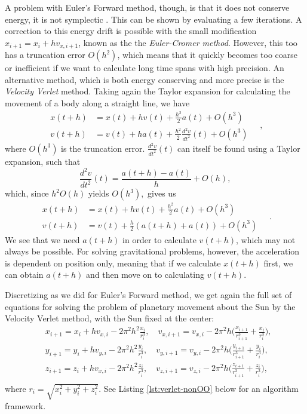 \documentclass[]{article}
\begin{document}
A problem with Euler's Forward method, though, is that it does not conserve energy, it is not symplectic \cite{notes-10-02}. This can be shown by evaluating a few iterations. A correction to this energy drift is possible with the small modification $x_{i+1} = x_i + hv_{x,i+1}$, known as the the \textit{Euler-Cromer method}. However, this too has a truncation error $O(h^2)$, which means that it quickly becomes too coarse or inefficient if we want to calculate long time spans with high precision. An alternative method, which is both energy conserving and more precise is the \textit{Velocity Verlet} method. Taking again the Taylor expansion for calculating the movement of a body along a straight line, we have
\begin{equation}
\begin{aligned}
	x(t+h) &= x(t) + hv(t) + \frac{h^2}{2}a(t) + O(h^3) \\
	v(t+h) &= v(t) + ha(t) + \frac{h^2}{2}\frac{d^2v}{dt^2}(t) + O(h^3)
\end{aligned} \quad ,
\end{equation}
where $O(h^3)$ is the truncation error. $\frac{d^2v}{dt^2}(t)$ can itself be found using a Taylor expansion, such that
\begin{equation}
	\frac{d^2v}{dt^2}(t) = \frac{a(t+h) - a(t)}{h} + O(h),
\end{equation}
which, since $h^2O(h)$ yields $O(h^3)$, gives us 
\begin{equation}
\begin{aligned}
	x(t+h) &= x(t) + hv(t) + \frac{h^2}{2}a(t) + O(h^3) \\
	v(t+h) &= v(t) + \frac{h}{2}(a(t+h) + a(t)) + O(h^3)
\end{aligned} \quad .
\end{equation}
We see that we need $a(t+h)$ in order to calculate $v(t+h)$, which may not always be possible. For solving gravitational problems, however, the acceleration is dependent on position only, meaning that if we calculate $x(t+h)$ first, we can obtain $a(t+h)$ and then move on to calculating $v(t+h)$.

Discretizing as we did for Euler's Forward method, we get again the full set of equations for solving the problem of planetary movement about the Sun by the Velocity Verlet method, with the Sun fixed at the center:
\begin{equation} \label{verlet}
\begin{aligned}
	&x_{i+1} = x_i + hv_{x,i} - 2\pi^2h^2\frac{x_i}{r_i^3} , \quad v_{x,i+1} = v_{x,i} - 2\pi^2h \bigg(\frac{x_{i+1}}{r_{i+1}^3} + \frac{x_i}{r_i^3} \bigg) ,\\
	&y_{i+1} = y_i + hv_{y,i}- 2\pi^2h^2\frac{y_i}{r_i^3} , \quad v_{y,i+1} = v_{y,i} - 2\pi^2h \bigg(\frac{y_{i+1}}{r_{i+1}^3} + \frac{y_i}{r_i^3} \bigg) ,\\
	&z_{i+1} = z_i + hv_{x,i}- 2\pi^2h^2\frac{z_i}{r_i^3} , \quad v_{z,i+1} = v_{z,i} - 2\pi^2h \bigg(\frac{z_{i+1}}{r_{i+1}^3} + \frac{z_i}{r_i^3} \bigg) ,\\
\end{aligned}
\end{equation}
where $r_i = \sqrt{x_i^2 + y_i^2 + z_i^2}$. See Listing \ref{lst:verlet-nonOO} below for an algorithm framework.
\end{document}
